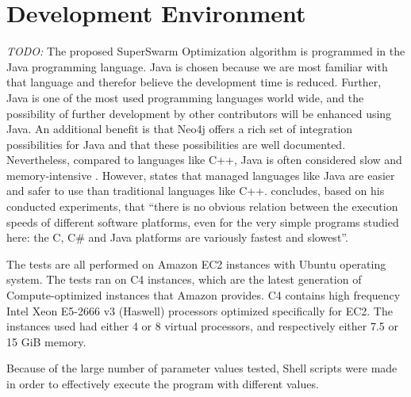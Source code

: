 \section{Development Environment}

\emph{\color{blue}TODO:} 
The proposed SuperSwarm Optimization algorithm is programmed in the Java programming language. Java is chosen because we are most familiar with that language and therefor believe the development time is reduced. Further, Java is one of the most used programming languages world wide, and the possibility of further development by other contributors will be enhanced using Java. An additional benefit is that Neo4j offers a rich set of integration possibilities for Java and that these possibilities are well documented. Nevertheless, compared to languages like C++, Java is often considered slow and memory-intensive \citep{alnaser12}. However, \citet{sestoft10} states that managed languages like Java are easier and safer to use than traditional languages like C++. \citet{sestoft10} concludes, based on his conducted experiments, that ``there is no obvious relation between the execution speeds of different software platforms, even for the very simple programs studied here: the C, C\# and Java platforms are variously fastest and slowest''. 

The tests are all performed on Amazon EC2 instances with Ubuntu operating system. The tests ran on C4 instances, which are the latest generation of Compute-optimized instances that Amazon provides. C4 contains high frequency Intel Xeon E5-2666 v3 (Haswell) processors optimized specifically for EC2. The instances used had either 4 or 8 virtual processors, and respectively either 7.5 or 15 GiB memory. 

Because of the large number of parameter values tested, Shell scripts were made in order to effectively execute the program with different values. 




